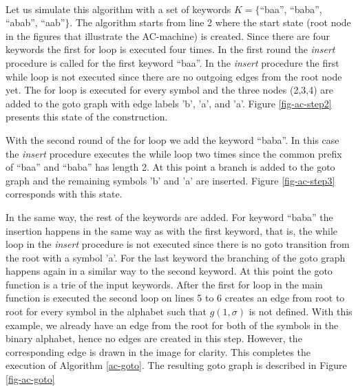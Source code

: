 \documentclass[english,twoside,censored,csm,algorithms-track-2020]{HYthesisML}
\theoremstyle{plain}
\theoremstyle{definition}
\begin{document}
  \begin{testexample}[]~\label{exmp-goto}\\
  Let us simulate this algorithm with a set of keywords $K=\{$``baa'', ``baba'', ``abab'', ``aab''$\}$.
  The algorithm starts from line 2 where the start state (root node in the figures that illustrate the AC-machine) is created.
  Since there are four keywords the first for loop is executed four times.
  In the first round the \textit{insert} procedure is called for the first keyword ``baa''.
  In the \textit{insert} procedure the first while loop is not executed since there are no
  outgoing edges from the root node yet. The for loop is executed for every symbol and the three
  nodes (2,3,4) are added to the goto graph with edge labels 'b', 'a', and 'a'.
  Figure \ref{fig-ac-step2} presents this state of the construction.




  With the second round of the for loop we add the keyword ``baba''. In this case the \textit{insert}
  procedure executes the while loop two times since the common prefix of ``baa'' and ``baba'' has length
  2. At this point a branch is added to the goto graph
  and the remaining symbols 'b' and 'a' are inserted.
  Figure \ref{fig-ac-step3} corresponds with this state.



  In the same way, the rest of the keywords are added. For keyword ``baba'' the insertion
  happens in the same way as with the first keyword, that is, the while loop in the \textit{insert}
  procedure is not executed since there is no goto transition from the root with a symbol 'a'.
  For the last keyword the branching of the goto graph happens again
  in a similar way to the second keyword. At this point the goto function is a trie of the
  input keywords. After the first for loop in the main function is executed
  the second loop on lines 5 to 6 creates an edge from root to root for every symbol in the
  alphabet such that $g(1,\sigma)$ is not defined. With this example, we already have an edge from the
  root for both of the symbols in the binary alphabet, hence no edges are created in this step.
  However, the corresponding edge is drawn in the image for clarity. This completes the execution of
  Algorithm \ref{ac-goto}.
  The resulting goto graph is described in Figure \ref{fig-ac-goto}

  \end{testexample}
\end{document}
